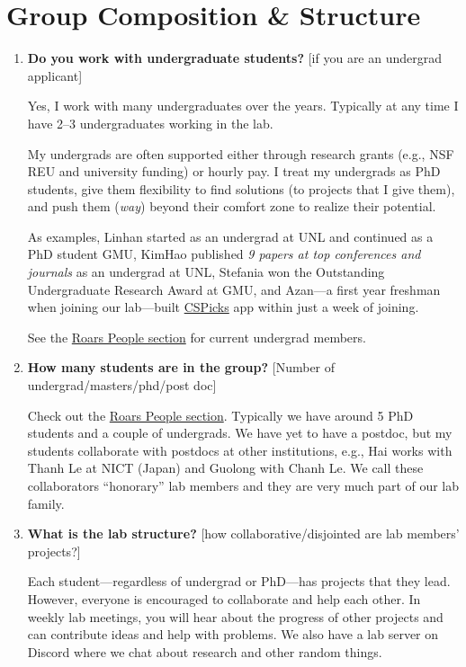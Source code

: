 \documentclass{article}
\begin{document}
\section{Group Composition \& Structure}

\begin{enumerate}[label=\arabic*.]
    \item \textbf{Do you work with undergraduate students?} [if you are an undergrad applicant]

    Yes, I work with many undergraduates over the years. Typically at any time I have 2--3 undergraduates working in the lab. 
    
    My undergrads are often supported either through research grants (e.g., NSF REU and university funding) or hourly pay. I treat my undergrads as PhD students, give them flexibility to find solutions (to projects that I give them), and push them (\emph{way}) beyond their comfort zone to realize their potential.
    
    As examples, Linhan started as an undergrad at UNL and continued as a PhD student GMU, KimHao published \emph{9 papers at top conferences and journals} as an undergrad at UNL, Stefania won the Outstanding Undergraduate Research Award at GMU, and Azan---a first year freshman when joining our lab---built \href{https://roars.dev/cspicks}{CSPicks} app within just a week of joining.

    See the \href{https://roars.dev#people}{Roars People section} for current undergrad members.

    \item \textbf{How many students are in the group?} [Number of undergrad/masters/phd/post doc]

    Check out the \href{https://roars.dev#people}{Roars People section}. Typically we have around 5 PhD students and a couple of undergrads. We have yet to have a postdoc, but my students collaborate with postdocs at other institutions, e.g., Hai works with Thanh Le at  NICT (Japan) and Guolong with Chanh Le.  We call these collaborators ``honorary'' lab members and they are very much part of our lab family.

    \item \textbf{What is the lab structure?} [how collaborative/disjointed are lab members' projects?]  

    Each student---regardless of undergrad or PhD---has projects that they lead. However, everyone is encouraged to collaborate and help each other. In weekly lab meetings, you will hear about the progress of other projects and can contribute ideas and help with problems. We also have a lab server on Discord where we chat about research and other random things.  
    

\end{enumerate}
\end{document}

